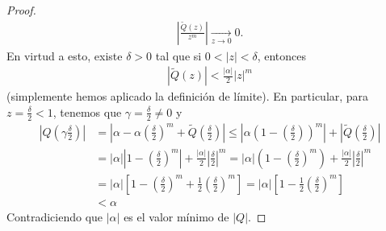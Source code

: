 \begin{proof}
\begin{align*}
    \left| \frac{\widetilde{Q}(z)}{z^m}\right| \xrightarrow[z \to 0]{} 0.
\end{align*}
En virtud a esto, existe $\delta > 0$ tal que si $0 < |z| < \delta$, entonces
\begin{align*}
    |\widetilde{Q}(z)| < \frac{|\alpha|}{2}|z|^m
\end{align*}
(simplemente hemos aplicado la definición de límite). En particular, para $z = \frac{\delta}{2} < 1$, tenemos que $\gamma = \frac{\delta}{2} \not = 0$ y
\begin{align*}
    \left|Q\left(\gamma \frac{\delta}{2}\right)\right| &= \left| \alpha - \alpha\left(\frac{\delta}{2}\right)^m + \widetilde{Q}\left( \frac{\delta}{2} \right)\right| \leq \left| \alpha\left( 1 - \left(\frac{\delta}{2}\right)\right)^m \right| + \left|\widetilde{Q}\left( \frac{\delta}{2} \right)\right| \\
    &= |\alpha| \left| 1 - \left( \frac{\delta}{2}\right)^m\right| + \frac{|\alpha|}{2}\left|\frac{\delta}{2}\right|^m = |\alpha| \left( 1 - \left( \frac{\delta}{2}\right)^m\right) + \frac{|\alpha|}{2}\left|\frac{\delta}{2}\right|^m \\
    &= |\alpha|\left[ 1 - \left( \frac{\delta}{2}\right)^m + \frac{1}{2}\left( \frac{\delta}{2}\right)^m\right] = |\alpha| \left[ 1 - \frac{1}{2}\left( \frac{\delta}{2}\right)^m\right] \\
    & < \alpha
\end{align*}
Contradiciendo que $|\alpha|$ es el valor mínimo de $|Q|$.
\end{proof}

